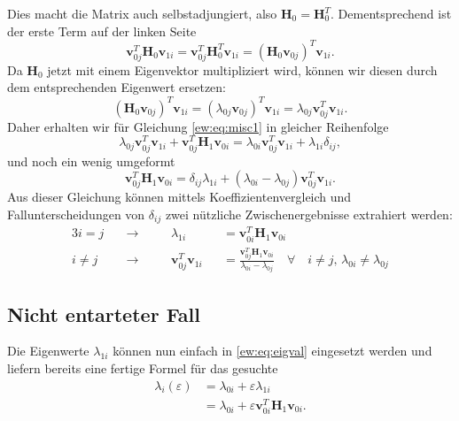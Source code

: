 Dies macht die Matrix auch selbstadjungiert, also $\bm H_0 = \bm H_0^T$. Dementsprechend ist der erste Term auf der linken Seite
\begin{equation}
    \bm v_{0j}^T \bm H_0 \bm v_{1i}
    =
    \bm v_{0j}^T \bm H_0^T \bm v_{1i}
    =
    \left( \bm H_0 \bm v_{0j} \right)^T \bm v_{1i}.
\end{equation}
Da $\bm H_0$ jetzt mit einem Eigenvektor multipliziert wird, können wir diesen durch dem entsprechenden Eigenwert ersetzen:
\begin{equation}
    \left( \bm H_0 \bm v_{0j} \right)^T \bm v_{1i}
    =
    \left( \lambda_{0j} \bm v_{0j} \right)^T \bm v_{1i}
    =
    \lambda_{0j} \bm v_{0j}^T \bm v_{1i}.
\end{equation}
Daher erhalten wir für Gleichung \eqref{ew:eq:misc1} in gleicher Reihenfolge
\begin{equation}
    \lambda_{0j} \bm v_{0j}^T \bm v_{1i} +
    \bm v_{0j}^T \bm H_1 \bm v_{0i}
    =
    \lambda_{0i} \bm v_{0j}^T \bm v_{1i} +
    \lambda_{1i} \delta_{ij},
\end{equation}
und noch ein wenig umgeformt
\begin{equation}
    \bm v_{0j}^T \bm H_1 \bm v_{0i}
    =
    \delta_{ij} \lambda_{1i} +
    ( \lambda_{0i} - \lambda_{0j} )
    \bm v_{0j}^T  \bm v_{1i} . \label{ew:eq:f}
\end{equation}
Aus dieser Gleichung können mittels Koeffizientenvergleich und Fallunterscheidungen von $\delta_{ij}$ zwei nützliche Zwischenergebnisse extrahiert werden:
\begin{alignat}{3}
    i = j \quad & \rightarrow  \quad && \lambda_{1i}&& = \bm v_{0i}^T \bm H_1 \bm v_{0i} \\
    i \neq j \quad & \rightarrow \quad && \bm v_{0j}^T \bm v_{1i}&& = \frac{\bm v_{0j}^T \bm H_1 \bm v_{0i}}{\lambda_{0i} - \lambda_{0j}} \quad \forall \quad  i \neq j, \, \lambda_{0i} \neq \lambda_{0j}  \label{ew:eq:f2}
\end{alignat}

\subsection{Nicht entarteter Fall}
%
%
Die Eigenwerte $\lambda_{1i}$ können nun einfach in \eqref{ew:eq:eigval} eingesetzt werden und liefern bereits eine fertige Formel für das gesuchte
\begin{align*}
    \lambda_i(\varepsilon)
    &=
    \lambda_{0i} + \varepsilon \lambda_{1i} \\
    &=
    \lambda_{0i} + \varepsilon \bm v_{0i}^T \bm H_1 \bm v_{0i}.
\end{align*}

